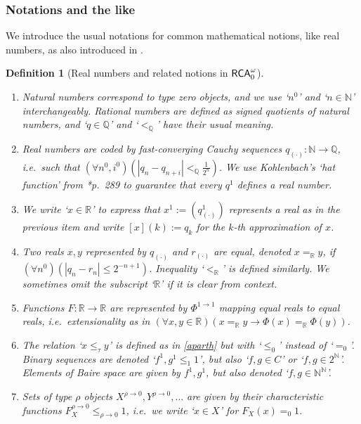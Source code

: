 \documentclass[reqno]{amsart}
\newtheorem{defi}[thm]{Definition}
\def\r{\mathbb{r}}
\def\RCAo{\textup{\textsf{RCA}}_{0}^{\omega}}
\def\N{{\mathbb  N}}
\def\Q{{\mathbb  Q}}
\def\R{{\mathbb  R}}
\def\di{\rightarrow}
\numberwithin{equation}{section}
\numberwithin{thm}{section}
\begin{document}
\subsubsection{Notations and the like}\label{kkk}
We introduce the usual notations for common mathematical notions, like real numbers, as also introduced in \cite{kohlenbach2}.  
\begin{defi}[Real numbers and related notions in $\RCAo$]\label{keepintireal}\rm~
\begin{enumerate}
 \renewcommand{\theenumi}{\alph{enumi}}
\item Natural numbers correspond to type zero objects, and we use `$n^{0}$' and `$n\in \N$' interchangeably.  Rational numbers are defined as signed quotients of natural numbers, and `$q\in \Q$' and `$<_{\Q}$' have their usual meaning.    
\item Real numbers are coded by fast-converging Cauchy sequences $q_{(\cdot)}:\N\di \Q$, i.e.\  such that $(\forall n^{0}, i^{0})(|q_{n}-q_{n+i}|<_{\Q} \frac{1}{2^{n}})$.  
We use Kohlenbach's `hat function' from \cite{kohlenbach2}*{p.\ 289} to guarantee that every $q^{1}$ defines a real number.  
\item We write `$x\in \R$' to express that $x^{1}:=(q^{1}_{(\cdot)})$ represents a real as in the previous item and write $[x](k):=q_{k}$ for the $k$-th approximation of $x$.    
\item Two reals $x, y$ represented by $q_{(\cdot)}$ and $r_{(\cdot)}$ are \emph{equal}, denoted $x=_{\R}y$, if $(\forall n^{0})(|q_{n}-r_{n}|\leq {2^{-n+1}})$. Inequality `$<_{\R}$' is defined similarly.  
We sometimes omit the subscript `$\R$' if it is clear from context.           
\item Functions $F:\R\di \R$ are represented by $\Phi^{1\di 1}$ mapping equal reals to equal reals, i.e.\ extensionality as in $(\forall x , y\in \R)(x=_{\R}y\di \Phi(x)=_{\R}\Phi(y))$.\label{EXTEN}
\item The relation `$x\leq_{\tau}y$' is defined as in \eqref{aparth} but with `$\leq_{0}$' instead of `$=_{0}$'.  Binary sequences are denoted `$f^{1}, g^{1}\leq_{1}1$', but also `$f,g\in C$' or `$f, g\in 2^{\N}$'.  Elements of Baire space are given by $f^{1}, g^{1}$, but also denoted `$f, g\in \N^{\N}$'.
\item Sets of type $\rho$ objects $X^{\rho\di 0}, Y^{\rho\di 0}, \dots$ are given by their characteristic functions $F^{\rho\di 0}_{X}\leq_{\rho\di 0}1$, i.e.\ we write `$x\in X$' for $ F_{X}(x)=_{0}1$. \label{koer} 
\end{enumerate}
\end{defi}
\end{document}
